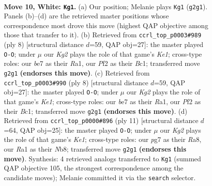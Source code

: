 \documentclass[11pt]{article}
\begin{document}
\clearpage

\begin{figure}[p]\centering
\begin{subfigure}{0.46\textwidth}\centering
\resizebox{\linewidth}{!}{%
\newchessgame
\chessboard[
  setfen={rnbqr1k1/pp1nbppp/4p3/2p5/2Pp2P1/1P3N1B/P2PPPKP/RNBQ1R2 w - - 1 10},
  showmover=false,
  pgfstyle=straightmove, color=movearrow, markmove={g2-g1}
]}
\caption{}
\end{subfigure}\hfill
\begin{subfigure}{0.46\textwidth}\centering
\resizebox{\linewidth}{!}{%
\newchessgame
\chessboard[
  setfen={rnbqkb1r/ppp2ppp/4pn2/8/2Pp4/5NP1/PP1PPPBP/RNBQK2R w KQkq - 0 5},
  showmover=false,
  pgfstyle=straightmove, color=movearrow, markmove={e1-g1}
]}
\caption{}
\end{subfigure}
\\[4pt]
\begin{subfigure}{0.46\textwidth}\centering
\resizebox{\linewidth}{!}{%
\newchessgame
\chessboard[
  setfen={rnbqkb1r/ppp2ppp/4pn2/8/2Pp4/5NP1/PP1PPPBP/RNBQK2R w KQkq - 0 5},
  showmover=false,
  pgfstyle=straightmove, color=movearrow, markmove={e1-g1}
]}
\caption{}
\end{subfigure}\hfill
\begin{subfigure}{0.46\textwidth}\centering
\resizebox{\linewidth}{!}{%
\newchessgame
\chessboard[
  setfen={rnbqk2r/1pp1ppbp/p2p1np1/8/2PPP3/4BP2/PP2N1PP/RN1QKB1R b KQkq - 1 6},
  showmover=false,
  pgfstyle=straightmove, color=movearrow, markmove={e8-g8}
]}
\caption{}
\end{subfigure}
\caption{\textbf{Move 10, White: \texttt{Kg1}.} (a) Our position; Melanie plays \texttt{Kg1} (\texttt{g2g1}). Panels (b)--(d) are the retrieved master positions whose correspondence most drove this move (highest QAP objective among those that transfer to it). (b) Retrieved from \texttt{ccrl\_top\_p0003\#989} (ply 8) [structural distance $d$=59, QAP obj=27]: the master played \texttt{O-O}; under $\mu$ our \emph{Kg2} plays the role of that game's \emph{Ke1}; cross-type roles: our \emph{b}e7 as their \emph{R}a1, our \emph{P}f2 as their \emph{B}c1; transferred move \texttt{g2g1} \textbf{(endorses this move)}. (c) Retrieved from \texttt{ccrl\_top\_p0003\#990} (ply 8) [structural distance $d$=59, QAP obj=27]: the master played \texttt{O-O}; under $\mu$ our \emph{Kg2} plays the role of that game's \emph{Ke1}; cross-type roles: our \emph{b}e7 as their \emph{R}a1, our \emph{P}f2 as their \emph{B}c1; transferred move \texttt{g2g1} \textbf{(endorses this move)}. (d) Retrieved from \texttt{ccrl\_top\_p0000\#896} (ply 11) [structural distance $d$=64, QAP obj=25]: the master played \texttt{O-O}; under $\mu$ our \emph{Kg2} plays the role of that game's \emph{Ke1}; cross-type roles: our \emph{p}g7 as their \emph{R}a8, our \emph{R}a1 as their \emph{N}b8; transferred move \texttt{g2g1} \textbf{(endorses this move)}. Synthesis: 4 retrieved analogs transferred to \texttt{Kg1} (summed QAP objective 105, the strongest correspondence among the candidate moves); Melanie committed it via the \texttt{search} selector.}
\label{fig:thought-m18}
\end{figure}
\end{document}
